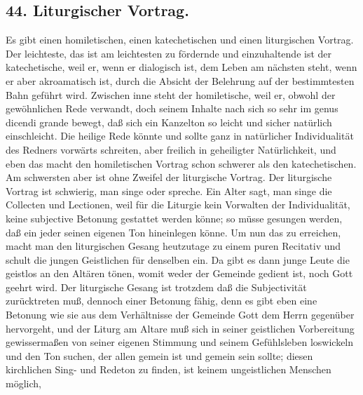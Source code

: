 \subsection*{44. Liturgischer Vortrag.}

Es gibt einen homiletischen, einen katechetischen und einen liturgischen Vortrag. Der leichteste, das ist am leichtesten zu fördernde und einzuhaltende ist der katechetische, weil er, wenn er dialogisch ist, dem Leben am nächsten steht, wenn er aber akroamatisch ist, durch die Absicht der Belehrung auf der
bestimmtesten Bahn geführt wird. Zwischen inne steht der homiletische, weil er, obwohl der gewöhnlichen Rede verwandt, doch seinem Inhalte nach sich so sehr im genus dicendi grande bewegt, daß sich ein Kanzelton so leicht und sicher natürlich einschleicht. Die heilige Rede könnte und sollte ganz in natürlicher Individualität des Redners vorwärts schreiten, aber freilich in geheiligter Natürlichkeit, und eben das macht den homiletischen Vortrag schon schwerer als den katechetischen. Am schwersten aber ist ohne Zweifel der liturgische Vortrag. Der liturgische Vortrag ist schwierig, man singe oder spreche. Ein Alter sagt, man singe die Collecten und Lectionen, weil für die Liturgie kein Vorwalten der Individualität, keine subjective Betonung gestattet werden könne; so müsse gesungen werden, daß ein jeder seinen eigenen Ton hineinlegen könne. Um nun das zu erreichen, macht man den liturgischen Gesang heutzutage zu einem puren Recitativ und schult die jungen Geistlichen für denselben ein. Da gibt es dann junge Leute die geistlos an den Altären tönen, womit weder der Gemeinde gedient ist, noch Gott geehrt wird. Der liturgische Gesang ist trotzdem daß die Subjectivität zurücktreten muß, dennoch einer Betonung fähig, denn es gibt eben eine Betonung wie sie aus dem Verhältnisse der Gemeinde Gott dem Herrn gegenüber hervorgeht, und der Liturg am Altare muß sich in seiner geistlichen Vorbereitung gewissermaßen von seiner eigenen Stimmung und seinem Gefühlsleben loswickeln und den Ton suchen, der allen gemein ist und gemein sein sollte; diesen kirchlichen Sing- und Redeton zu finden, ist keinem ungeistlichen Menschen möglich,
